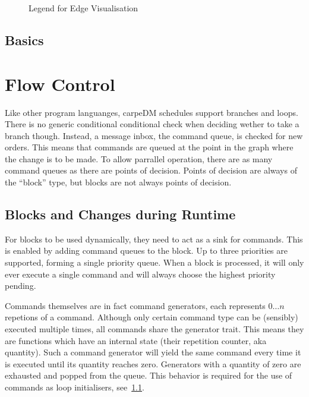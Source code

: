 \begin{figure}[H]
\def\svgwidth{0.8\textwidth}
\graphicspath{{Figures/}}

\caption{Legend for Edge Visualisation }
\label{fig:legend_nodes}
\end{figure}


\subsection{Basics}

\newpage
\section{Flow Control}
Like other program languanges, carpeDM schedules support branches and loops. There is no generic conditional conditional check when deciding wether to take a branch though. Instead, a message inbox,
the command queue, is checked for new orders. This means that commands are queued at the point in the graph where the change is to be made.
To allow parrallel operation, there are as many command queues as there are points of decision. Points of decision are always of the \enquote{block} type, but blocks are not always points of decision.

\subsection{Blocks and Changes during Runtime}
For blocks to be used dynamically, they need to act as a sink for commands. This is enabled by adding command queues to the block. Up to three priorities are supported, forming a single priority queue. When a block is processed, it will only ever execute a single command and will always choose the highest priority pending.
\par
Commands themselves are in fact command generators, each represents $0\dots n$ repetions of a command. Although only certain command type can be (sensibly) executed multiple times, all commands share the generator trait. This means they are functions which have an internal state (their repetition counter, aka quantity). Such a command generator will yield the same command every time it is executed until its quantity reaches zero. Generators with a quantity of zero are exhausted and popped from the queue. This behavior is required for the use of commands as loop initialisers, see~\ref{}.

